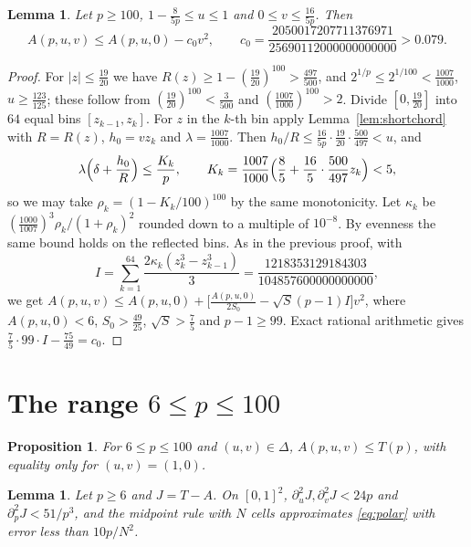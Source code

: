 \documentclass[11pt]{amsart}
\newtheorem{proposition}[theorem]{Proposition}
\newtheorem{lemma}[theorem]{Lemma}
\theoremstyle{definition}
\theoremstyle{remark}
\numberwithin{equation}{section}
\begin{document}
\begin{lemma}\label{lem:chord100}
Let $p\ge100$, $1-\frac8{5p}\le u\le1$ and $0\le v\le\frac{16}{5p}$. Then
\[
A(p,u,v)\le A(p,u,0)-c_0v^2,\qquad c_0=\frac{2050017207711376971}{25690112000000000000}>0.079 .
\]
\end{lemma}

\begin{proof}
For $|z|\le\frac{19}{20}$ we have $R(z)\ge1-(\frac{19}{20})^{100}>\frac{497}{500}$, and $2^{1/p}\le2^{1/100}<\frac{1007}{1000}$, $u\ge\frac{123}{125}$; these follow from $(\frac{19}{20})^{100}<\frac3{500}$ and $(\frac{1007}{1000})^{100}>2$. Divide $[0,\frac{19}{20}]$ into $64$ equal bins $[z_{k-1},z_k]$. For $z$ in the $k$-th bin apply Lemma~\ref{lem:shortchord} with $R=R(z)$, $h_0=vz_k$ and $\lambda=\frac{1007}{1000}$. Then $h_0/R\le\frac{16}{5p}\cdot\frac{19}{20}\cdot\frac{500}{497}<u$, and
\[
\lambda\Bigl(\delta+\frac{h_0}R\Bigr)\le\frac{K_k}p,\qquad K_k=\frac{1007}{1000}\Bigl(\frac85+\frac{16}5\cdot\frac{500}{497}z_k\Bigr)<5,
\]
so we may take $\rho_k=(1-K_k/100)^{100}$ by the same monotonicity. Let $\kappa_k$ be $(\frac{1000}{1007})^3\rho_k/(1+\rho_k)^2$ rounded down to a multiple of $10^{-8}$. By evenness the same bound holds on the reflected bins. As in the previous proof, with
\[
I=\sum_{k=1}^{64}\frac{2\kappa_k(z_k^3-z_{k-1}^3)}3=\frac{1218353129184303}{104857600000000000},
\]
we get $A(p,u,v)\le A(p,u,0)+\bigl[\frac{A(p,u,0)}{2S_0}-\sqrt S(p-1)I\bigr]v^2$, where $A(p,u,0)<6$, $S_0>\frac{49}{25}$, $\sqrt S>\frac75$ and $p-1\ge99$. Exact rational arithmetic gives $\frac75\cdot99\cdot I-\frac{75}{49}=c_0$.
\end{proof}

\section{The range \texorpdfstring{$6\le p\le100$}{6<=p<=100}}\label{sec:6100}

\begin{proposition}\label{prop:6100}
For $6\le p\le100$ and $(u,v)\in\Delta$, $A(p,u,v)\le T(p)$, with equality only for $(u,v)=(1,0)$.
\end{proposition}

\begin{lemma}\label{lem:6constants}
Let $p\ge6$ and $J=T-A$. On $[0,1]^2$, $\partial_u^2J,\partial_v^2J<24p$ and $\partial_p^2J<51/p^3$, and the midpoint rule with $N$ cells approximates \eqref{eq:polar} with error less than $10p/N^2$.
\end{lemma}
\end{document}
